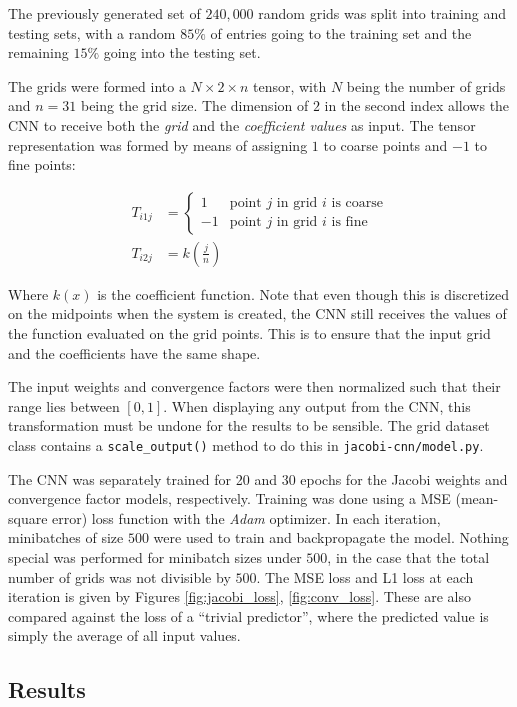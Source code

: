 The previously generated set of $240,000$ random grids was split into training and testing sets, with a random $85\%$ of entries going to the training set and the remaining $15\%$ going into the testing set.

The grids were formed into a $N\times 2 \times n$ tensor, with $N$ being the number of grids and $n=31$ being the grid size.  The dimension of $2$ in the second index allows the CNN to receive both the \textit{grid} and the \textit{coefficient values} as input.  The tensor representation was formed by means of assigning $1$ to coarse points and $-1$ to fine points:

\begin{align*}
T_{i1j} &= \begin{cases}
1 & \text{point $j$ in grid $i$ is coarse}\\
-1 & \text{point $j$ in grid $i$ is fine}
\end{cases}\\
T_{i2j} &= k\left(\frac{j}{n}\right)
\end{align*}

Where $k\left(x\right)$ is the coefficient function.  Note that even though this is discretized on the midpoints when the system is created, the CNN still receives the values of the function evaluated on the grid points.  This is to ensure that the input grid and the coefficients have the same shape.

The input weights and convergence factors were then normalized such that their range lies between $\left[0, 1\right]$.  When displaying any output from the CNN, this transformation must be undone for the results to be sensible.  The grid dataset class contains a \texttt{scale\_output()} method to do this in \texttt{jacobi-cnn/model.py}.

The CNN was separately trained for 20 and 30 epochs for the Jacobi weights and convergence factor models, respectively.  Training was done using a MSE (mean-square error) loss function with the \textit{Adam} optimizer.  In each iteration, minibatches of size $500$ were used to train and backpropagate the model.  Nothing special was performed for minibatch sizes under $500$, in the case that the total number of grids was not divisible by $500$.  The MSE loss and L1 loss at each iteration is given by Figures \ref{fig:jacobi_loss}, \ref{fig:conv_loss}.  These are also compared against the loss of a ``trivial predictor'', where the predicted value is simply the average of all input values.

\subsection{Results}

